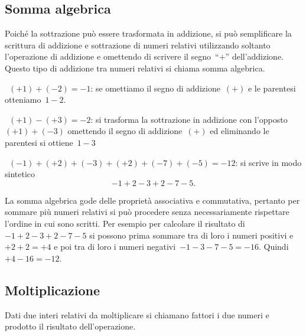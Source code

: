 
\subsection{Somma algebrica}

Poiché la sottrazione può essere trasformata in addizione, si può 
semplificare 
la scrittura di addizione
e sottrazione di numeri relativi utilizzando soltanto l'operazione di 
addizione 
e omettendo di scrivere
il segno~``\(+\)'' dell'addizione. Questo tipo di addizione tra numeri 
relativi si 
chiama somma algebrica.

 \begin{esempio}
~\((+1)+(-2)=-1\): se omettiamo il segno di addizione~\((+)\) e le 
parentesi 
otteniamo~\(1-2\).
 \end{esempio}

\begin{esempio}
~\((+1)-(+3)=-2\): si trasforma la sottrazione in addizione con 
l'opposto~\((+1)+(-3)\) omettendo il segno
di addizione~\((+)\) ed eliminando le parentesi si ottiene~\(1-3\)
 \end{esempio}

\begin{esempio}
~\((-1)+(+2)+(-3)+(+2)+(-7)+(-5)=-12\): si scrive in modo sintetico 
\[-1+2-3+2-7-5.\]
 \end{esempio}


La somma algebrica gode delle proprietà associativa e commutativa, pertanto 
per 
sommare più numeri relativi
si può procedere senza necessariamente rispettare l'ordine in cui sono 
scritti. 
Per esempio per calcolare
il risultato di~\(-1+2-3+2-7-5\) si possono prima sommare tra di loro i 
numeri 
positivi e~\(+2+2=+4\)
e poi tra di loro i numeri negativi~\(-1-3-7-5=-16\). Quindi~\(+4-16=-12\).


\subsection{Moltiplicazione}

Dati due interi relativi da moltiplicare si chiamano fattori i due numeri e 
prodotto il
risultato dell'operazione.

